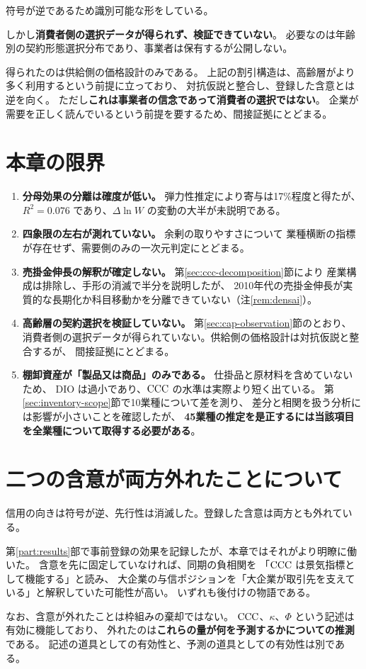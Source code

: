符号が逆であるため識別可能な形をしている。

しかし\textbf{消費者側の選択データが得られず、検証できていない}。
必要なのは年齢別の契約形態選択分布であり、事業者は保有するが公開しない。

得られたのは供給側の価格設計のみである。
上記の割引構造は、高齢層がより多く利用するという前提に立っており、
対抗仮説と整合し、登録した含意とは逆を向く。
ただし\textbf{これは事業者の信念であって消費者の選択ではない}。
企業が需要を正しく読んでいるという前提を要するため、間接証拠にとどまる。

\section{本章の限界}

\begin{enumerate}[label=(\arabic*)]
\item \textbf{分母効果の分離は確度が低い。} 弾力性推定により寄与は17\%程度と得たが、
$R^2=0.076$ であり、$\Delta\ln W$ の変動の大半が未説明である。

\item \textbf{四象限の左右が測れていない。} 余剰の取りやすさについて
業種横断の指標が存在せず、需要側のみの一次元判定にとどまる。

\item \textbf{売掛金伸長の解釈が確定しない。} 第\ref{sec:ccc-decomposition}節により
産業構成は排除し、手形の消滅で半分を説明したが、
2010年代の売掛金伸長が実質的な長期化か科目移動かを分離できていない（注\ref{rem:densai}）。

\item \textbf{高齢層の契約選択を検証していない。} 第\ref{sec:cap-observation}節のとおり、
消費者側の選択データが得られていない。供給側の価格設計は対抗仮説と整合するが、
間接証拠にとどまる。

\item \textbf{棚卸資産が「製品又は商品」のみである。} 仕掛品と原材料を含めていないため、
$\mathrm{DIO}$ は過小であり、$\mathrm{CCC}$ の水準は実際より短く出ている。
第\ref{sec:inventory-scope}節で10業種について差を測り、
差分と相関を扱う分析には影響が小さいことを確認したが、
\textbf{45業種の推定を是正するには当該項目を全業種について取得する必要がある}。
\end{enumerate}

\section{二つの含意が両方外れたことについて}
\label{sec:two-rejections}

信用の向きは符号が逆、先行性は消滅した。登録した含意は両方とも外れている。

第\ref{part:results}部で事前登録の効果を記録したが、本章ではそれがより明瞭に働いた。
含意を先に固定していなければ、同期の負相関を
「$\mathrm{CCC}$ は景気指標として機能する」と読み、
大企業の与信ポジションを「大企業が取引先を支えている」と解釈していた可能性が高い。
いずれも後付けの物語である。

なお、含意が外れたことは枠組みの棄却ではない。
$\mathrm{CCC}$、$\kappa$、$\Phi$ という記述は有効に機能しており、
外れたのは\textbf{これらの量が何を予測するかについての推測}である。
記述の道具としての有効性と、予測の道具としての有効性は別である。
